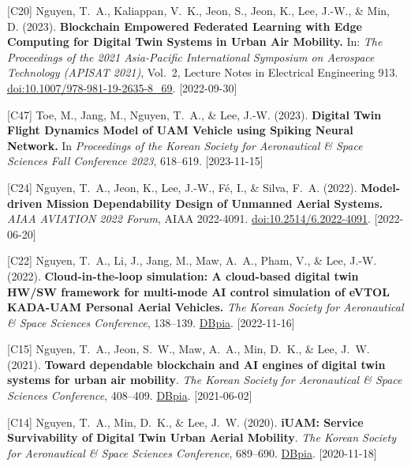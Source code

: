 {\begin{pubenumerate}
\item {\color{green}[C20]} Nguyen, T.\ A., Kaliappan, V.\ K., Jeon, S., Jeon, K., Lee, J.-W., \& Min, D. (2023). \textbf{Blockchain Empowered Federated Learning with Edge Computing for Digital Twin Systems in Urban Air Mobility.} In: \textit{The Proceedings of the 2021 Asia-Pacific International Symposium on Aerospace Technology (APISAT 2021)}, Vol.\ 2, Lecture Notes in Electrical Engineering 913. \href{https://doi.org/10.1007/978-981-19-2635-8_69}{doi:10.1007/978-981-19-2635-8\_69}. [2022-09-30]

\item {\color{green}[C47]} Toe, M., Jang, M., Nguyen, T.\ A., \& Lee, J.-W. (2023). 
  \textbf{Digital Twin Flight Dynamics Model of UAM Vehicle using Spiking Neural Network.} 
  In \textit{Proceedings of the Korean Society for Aeronautical \& Space Sciences Fall Conference 2023}, 618--619. [2023-11-15]

\item {\color{green}[C24]} Nguyen, T.\ A., Jeon, K., Lee, J.-W., F\'e, I., \& Silva, F.\ A. (2022). \textbf{Model-driven Mission Dependability Design of Unmanned Aerial Systems.} \textit{AIAA AVIATION 2022 Forum}, AIAA 2022-4091. \href{https://doi.org/10.2514/6.2022-4091}{doi:10.2514/6.2022-4091}. [2022-06-20]

\item {\color{green}[C22]} Nguyen, T.\ A., Li, J., Jang, M., Maw, A.\ A., Pham, V., \& Lee, J.-W. (2022). \textbf{Cloud-in-the-loop simulation: A cloud-based digital twin HW/SW framework for multi-mode AI control simulation of eVTOL KADA-UAM Personal Aerial Vehicles.} \textit{The Korean Society for Aeronautical \& Space Sciences Conference}, 138--139. \href{https://www.dbpia.co.kr/journal/articleDetail?nodeId=NODE11076743}{DBpia}. [2022-11-16]

\item {\color{green}[C15]} Nguyen, T.\ A., Jeon, S.\ W., Maw, A.\ A., Min, D.\ K., \& Lee, J.\ W. (2021). \textbf{Toward dependable blockchain and AI engines of digital twin systems for urban air mobility}. \textit{The Korean Society for Aeronautical \& Space Sciences Conference}, 408--409. \href{http://www.dbpia.co.kr/journal/articleDetail?nodeId=NODE10613629}{DBpia}. [2021-06-02]

\item {\color{green}[C14]} Nguyen, T.\ A., Min, D.\ K., \& Lee, J.\ W. (2020). \textbf{iUAM: Service Survivability of Digital Twin Urban Aerial Mobility}. \textit{The Korean Society for Aeronautical \& Space Sciences Conference}, 689--690. \href{https://www.dbpia.co.kr/journal/articleDetail?nodeId=NODE10526249}{DBpia}. [2020-11-18]


\end{pubenumerate}}
